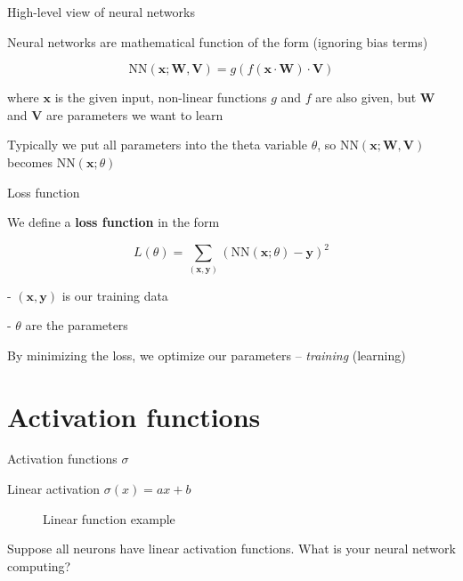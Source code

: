 \documentclass[12pt]{beamer}
\begin{document}
\begin{frame}{High-level view of neural networks}
	
Neural networks are mathematical function of the form (ignoring bias terms)

$$
\mathrm{NN}(\mathbf{x}; \mathbf{W}, \mathbf{V}) = g(f(\mathbf{x} \cdot \mathbf{W}) \cdot \mathbf{V})
$$

where $\mathbf{x}$ is the given input, non-linear functions $g$ and $f$ are also given, but $\mathbf{W}$ and $\mathbf{V}$ are parameters we want to learn

Typically we put all parameters into the theta variable $\theta$, so $\mathrm{NN}(\mathbf{x}; \mathbf{W}, \mathbf{V})$ becomes $\mathrm{NN}(\mathbf{x}; \theta)$
	
\end{frame}

\begin{frame}{Loss function}
	
We define a \textbf{loss function} in the form

$$
L(\theta) = \sum_{(\mathbf{x}, \mathbf{y})} \left( \mathrm{NN}(\mathbf{x}; \theta) - \mathbf{y} \right)^2
$$

- $(\mathbf{x}, \mathbf{y})$ is our training data

- $\theta$ are the parameters

By minimizing the loss, we optimize our parameters -- \emph{training} (learning)



\end{frame}

\section{Activation functions}

\begin{frame}{Activation functions $\sigma$}
	
Linear activation $\sigma(x) = ax + b$

	\begin{figure}
	\caption{Linear function example}
\end{figure}

Suppose all neurons have linear activation functions. What is your neural network computing?

\end{frame}
\end{document}
